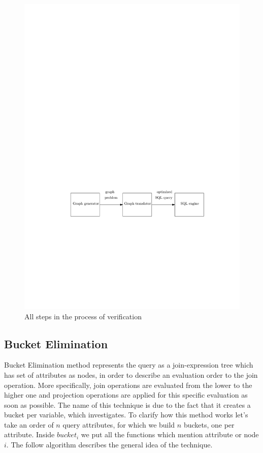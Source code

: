 \begin{figure}
	\includegraphics{figures/process.pdf}
	\caption{All steps in the process of verification}
	\label{fig:process}
\end{figure}

\subsection{Bucket Elimination} \label{subsec:MethodologyBucketElim}
Bucket Elimination method represents the query as a join-expression tree which has set of attributes as nodes, in order to describe an evaluation order to the join operation. More specifically, join operations are evaluated from the lower to the higher one and projection operations are applied for this specific evaluation as soon as possible.  The name of this technique is due to the fact that it creates a bucket per variable, which investigates. To clarify how this method works let’s take an order of $n$ query attributes, for which we build $n$ buckets, one per attribute. Inside $bucket_i$ we put all the functions which mention attribute or node $i$. The follow algorithm describes the general idea of the technique.

